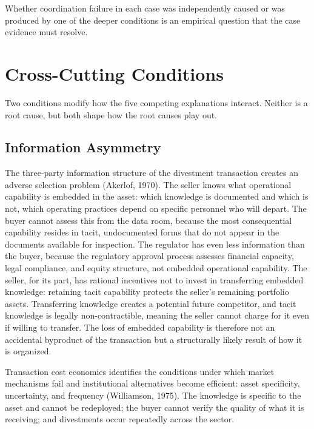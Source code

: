 Whether coordination failure in each case was independently caused or
was produced by one of the deeper conditions is an empirical question
that the case evidence must resolve.

\hypertarget{cross-cutting-conditions}{%
\section{Cross-Cutting Conditions}\label{cross-cutting-conditions}}

Two conditions modify how the five competing explanations interact.
Neither is a root cause, but both shape how the root causes play out.

\hypertarget{information-asymmetry}{%
\subsection{Information Asymmetry}\label{information-asymmetry}}

The three-party information structure of the divestment transaction
creates an adverse selection problem (Akerlof, 1970). The seller knows
what operational capability is embedded in the asset: which knowledge is
documented and which is not, which operating practices depend on
specific personnel who will depart. The buyer cannot assess this from
the data room, because the most consequential capability resides in
tacit, undocumented forms that do not appear in the documents available
for inspection. The regulator has even less information than the buyer,
because the regulatory approval process assesses financial capacity,
legal compliance, and equity structure, not embedded operational
capability. The seller, for its part, has rational incentives not to
invest in transferring embedded knowledge: retaining tacit capability
protects the seller's remaining portfolio assets. Transferring knowledge
creates a potential future competitor, and tacit knowledge is legally
non-contractible, meaning the seller cannot charge for it even if
willing to transfer. The loss of embedded capability is therefore not an
accidental byproduct of the transaction but a structurally likely result
of how it is organized.

Transaction cost economics identifies the conditions under which market
mechanisms fail and institutional alternatives become efficient: asset
specificity, uncertainty, and frequency (Williamson, 1975). The
knowledge is specific to the asset and cannot be redeployed; the buyer
cannot verify the quality of what it is receiving; and divestments occur
repeatedly across the sector.

